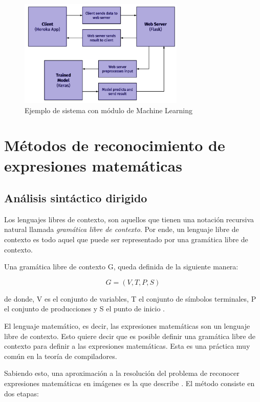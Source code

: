 \begin{figure}[H]
	\centering
	\includegraphics[width=0.7\textwidth]{capitulo2/images/DLAAS.png}
	\caption{Ejemplo de sistema con módulo de Machine Learning}
	\label{fig:DLAAS}
\end{figure}


\section{Métodos de reconocimiento de expresiones matemáticas}
\subsection{Análisis sintáctico dirigido}
Los lenguajes libres de contexto, son aquellos que tienen una notación recursiva natural llamada \textit{gramática libre de contexto}. Por ende, un lenguaje libre de contexto es todo aquel que puede ser representado por una gramática libre de contexto.

Una gramática libre de contexto G, queda definida de la siguiente manera:

\begin{equation}
G = (V, T, P, S)
\end{equation}

de donde, V es el conjunto de variables, T el conjunto de símbolos terminales, P el conjunto de producciones y S el punto de inicio \cite{automata}.

El lenguaje matemático, es decir, las expresiones matemáticas son un lenguaje libre de contexto. Esto quiere decir que es posible definir una gramática libre de contexto para definir a las expresiones matemáticas. Esta es una práctica muy común en la teoría de compiladores.

Sabiendo esto, una aproximación a la resolución del problema de reconocer expresiones matemáticas en imágenes es la que describe \cite{gramaticasAnderson}. El método consiste en dos etapas:

